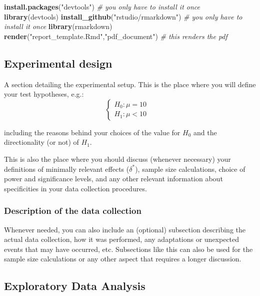 \documentclass[
]{article}
\newenvironment{Shaded}{\begin{snugshade}}{\end{snugshade}}
\newcommand{\CommentTok}[1]{\textcolor[rgb]{0.56,0.35,0.01}{\textit{#1}}}
\newcommand{\FunctionTok}[1]{\textcolor[rgb]{0.13,0.29,0.53}{\textbf{#1}}}
\newcommand{\NormalTok}[1]{#1}
\newcommand{\StringTok}[1]{\textcolor[rgb]{0.31,0.60,0.02}{#1}}
\begin{document}
\begin{Shaded}
\begin{Highlighting}[]
\FunctionTok{install.packages}\NormalTok{(}\StringTok{"devtools"}\NormalTok{)                    }\CommentTok{\# you only have to install it once}
\FunctionTok{library}\NormalTok{(devtools)}
\FunctionTok{install\_github}\NormalTok{(}\StringTok{"rstudio/rmarkdown"}\NormalTok{)             }\CommentTok{\# you only have to install it once}
\FunctionTok{library}\NormalTok{(rmarkdown)}
\FunctionTok{render}\NormalTok{(}\StringTok{"report\_template.Rmd"}\NormalTok{,}\StringTok{"pdf\_document"}\NormalTok{)    }\CommentTok{\# this renders the pdf}
\end{Highlighting}
\end{Shaded}

\subsection{Experimental design}\label{experimental-design}

A section detailing the experimental setup. This is the place where you
will define your test hypotheses, e.g.:
\[\begin{cases} H_0: \mu = 10&\\H_1: \mu<10\end{cases}\]

including the reasons behind your choices of the value for \(H_0\) and
the directionality (or not) of \(H_1\).

This is also the place where you should discuss (whenever necessary)
your definitions of minimally relevant effects (\(\delta^*\)), sample
size calculations, choice of power and significance levels, and any
other relevant information about specificities in your data collection
procedures.

\subsubsection{Description of the data
collection}\label{description-of-the-data-collection}

Whenever needed, you can also include an (optional) subsection
describing the actual data collection, how it was performed, any
adaptations or unexpected events that may have occurred, etc.
Subsections like this can also be used for the sample size calculations
or any other aspect that requires a longer discussion.

\subsection{Exploratory Data Analysis}\label{exploratory-data-analysis}
\end{document}
